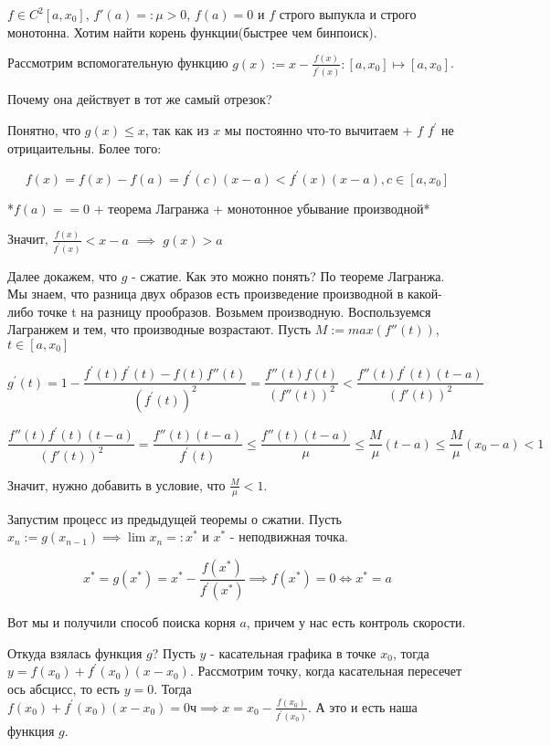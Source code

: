 \begin{example} \thmslashn
	
	$f \in C^2[a, x_0]$, $f'(a) =: \mu > 0$, $f(a) = 0$ и $f$ строго выпукла и строго монотонна. Хотим найти корень функции(быстрее чем бинпоиск).
	
	Рассмотрим вспомогательную функцию $g(x) := x - \frac{f(x)}{f^\prime(x)} : [a, x_0] \mapsto [a, x_0]$.
	
	Почему она действует в тот же самый отрезок?
	
	Понятно, что $g(x) \le x$, так как из $x$ мы постоянно что-то вычитаем + $f$ $f^\prime$ не отрицаительны. Более того:
	
	\[
	f(x) = f(x) - f(a) = f^\prime(c)(x - a) < f^\prime(x)(x - a), c \in [a, x_0]
	\]
	
	*$f(a) == 0$ + теорема Лагранжа + монотонное убывание производной*
	
	Значит, $\frac{f(x)}{f^\prime(x)} < x - a$ $\implies$ $g(x) > a$
	
	Далее докажем, что $g$ - сжатие. Как это можно понять? По теореме Лагранжа. Мы знаем, что разница двух образов есть произведение производной в какой-либо точке t на разницу прообразов. Возьмем производную. Воспользуемся Лагранжем и тем, что производные возрастают. Пусть $M := max(f''(t))$, $t \in [a, x_0]$
	
	
	\[
	g^\prime(t) = 
	1 - \frac{f^\prime(t)f^\prime(t) - f(t) f''(t)}{(f^\prime(t))^2}
	=
	\frac{f''(t) f(t)}{(f''(t))^2} 
	<
	\frac{f''(t) f^\prime(t)(t  - a)}{(f'(t))^2}
	\]
	
	\[
	\frac{f''(t) f^\prime(t)(t  - a)}{(f'(t))^2}
	=
	\frac{f''(t)(t-a)}{f^{\prime}(t)} \le
	\frac{f''(t)(t-a)}{\mu}
	\le
	\frac{M}{\mu}(t-a)
	\le
	\frac{M}{\mu}(x_0-a)
	< 1
	\]
	
	Значит, нужно добавить в условие, что $\frac{M}{\mu} < 1$.
	
	Запустим процесс из предыдущей теоремы о сжатии. Пусть $x_n := g(x_{n - 1}) \implies \lim x_n = :x^*$ и $x^*$ - неподвижная точка.
	
	\[
	x^* = g(x^*) = x^* - \frac{f(x^*)}{f^\prime(x^*)} \implies f(x^*) = 0 \iff x^* = a
	\]
	
	Вот мы и получили способ поиска корня $a$, причем у нас есть контроль скорости.
	
\end{example}

\begin{remark} \thmslashn
	
	Откуда взялась функция $g$? Пусть $y$ - касательная графика в точке $x_0$, тогда $y = f(x_0) + f^\prime(x_0)(x - x_0)$. Рассмотрим точку, когда касательная пересечет ось абсцисс, то есть $y = 0$. Тогда  $f(x_0) + f^\prime(x_0)(x - x_0) = 0ч	 \implies x = x_0 - \frac{f(x_0)}{f^\prime(x_0)}$. А это и есть наша функция $g$.
\end{remark}